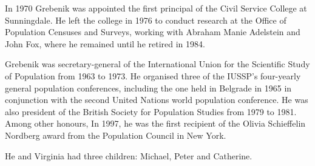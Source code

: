 In 1970 Grebenik was appointed the first principal of the Civil Service College at Sunningdale. He left the college in 1976 to conduct research at the Office of Population Censuses and Surveys, working with Abraham Manie Adelstein and John Fox, where he remained until he retired in 1984.

Grebenik was secretary-general of the International Union for the Scientific Study of Population from 1963 to 1973. He organised three of the IUSSP's four-yearly general population conferences, including the one held in Belgrade in 1965 in conjunction with the second United Nations world population conference. He was also president of the British Society for Population Studies from 1979 to 1981. Among other honours, In 1997, he was the first recipient of the Olivia Schieffelin Nordberg award from the Population Council in New York.

He and Virginia had three children: Michael, Peter and Catherine.
